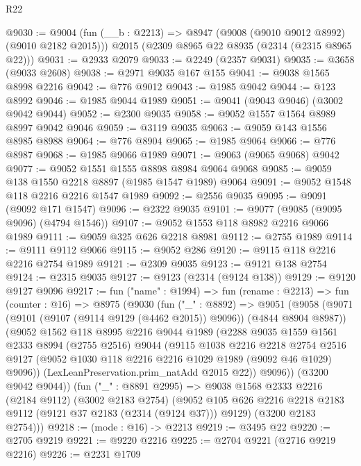 \begin{lexlean}{R22}
\begin{coremodule}
@9030 := @9004
    (fun (__b : @2213) => @8947 (@9008 (@9010 @9012 @8992) (@9010 @2182 @2015)))
    @2015
    (@2309 @8965 @22 @8935 (@2314 (@2315 @8965 @22)))
@9031 := @2933 @2079
@9033 := @2249 (@2357 @9031)
@9035 := @3658 (@9033 @2608)
@9038 := @2971 @9035 @167 @155
@9041 := @9038 @1565 @8998 @2216
@9042 := @776 @9012
@9043 := @1985 @9042
@9044 := @123 @8992
@9046 := @1985 @9044 @1989
@9051 := @9041 (@9043 @9046) (@3002 @9042 @9044)
@9052 := @2300 @9035
@9058 := @9052 @1557 @1564 @8989 @8997 @9042 @9046
@9059 := @3119 @9035
@9063 := @9059 @143 @1556 @8985 @8988
@9064 := @776 @8904
@9065 := @1985 @9064
@9066 := @776 @8987
@9068 := @1985 @9066 @1989
@9071 := @9063 (@9065 @9068) @9042
@9077 := @9052 @1551 @1555 @8898 @8984 @9064 @9068
@9085 := @9059 @138 @1550 @2218 @8897 (@1985 @1547 @1989) @9064
@9091 := @9052 @1548 @118 @2216 @2216 @1547 @1989
@9092 := @2556 @9035
@9095 := @9091 (@9092 @171 @1547)
@9096 := @2322 @9035
@9101 := @9077 (@9085 (@9095 @9096) (@4794 @1546))
@9107 := @9052 @1553 @118 @8982 @2216 @9066 @1989
@9111 := @9059 @325 @626 @2218 @8981
@9112 := @2755 @1989
@9114 := @9111 @9112 @9066
@9115 := @9052 @286
@9120 := @9115 @118 @2216 @2216 @2754 @1989
@9121 := @2309 @9035
@9123 := @9121 @138 @2754
@9124 := @2315 @9035
@9127 := @9123 (@2314 (@9124 @138))
@9129 := @9120 @9127 @9096
@9217 := fun ("name" : @1994) =>
  fun (rename : @2213) =>
  fun (counter : @16) =>
  @8975
    (@9030
      (fun ("_" : @8892) =>
      @9051
        (@9058
          (@9071 (@9101 (@9107 (@9114 @9129 (@4462 @2015)) @9096)) (@4844 @8904 @8987))
          (@9052
            @1562
            @118
            @8995
            @2216
            @9044
            @1989
            (@2288
              @9035
              @1559
              @1561
              @2333
              @8994
              (@2755 @2516)
              @9044
              (@9115
                @1038
                @2216
                @2218
                @2754
                @2516
                @9127
                (@9052 @1030 @118 @2216 @2216 @1029 @1989 (@9092 @46 @1029) @9096))
              (LexLeanPreservation.prim_natAdd @2015 @22))
            @9096))
        (@3200 @9042 @9044))
      (fun ("_" : @8891 @2995) =>
      @9038
        @1568
        @2333
        @2216
        (@2184 @9112)
        (@3002 @2183 @2754)
        (@9052 @105 @626 @2216 @2218 @2183 @9112 (@9121 @37 @2183 (@2314 (@9124 @37))) @9129)
        (@3200 @2183 @2754)))
@9218 := (mode : @16) -> @2213
@9219 := @3495 @22
@9220 := @2705 @9219
@9221 := @9220 @2216
@9225 := @2704 @9221 (@2716 @9219 @2216)
@9226 := @2231 @1709

\end{coremodule}
\end{lexlean}
